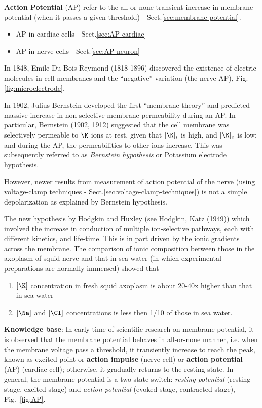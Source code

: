 {\bf Action Potential} (AP) refer to the all-or-none transient increase in
membrane potential (when it passes a given threshold) -
Sect.\ref{sec:membrane-potential}.
\begin{itemize}
  \item AP in cardiac cells - Sect.\ref{sec:AP-cardiac}
  \item AP in nerve cells - Sect.\ref{sec:AP-neuron}
\end{itemize} 

\begin{mdframed}
In 1848, Emile Du-Bois Reymond (1818-1896) discovered the existence of electric
molecules in cell membranes and the ``negative'' variation (the nerve AP),
Fig.\ref{fig:microelectrode}. 

In 1902, Julius Bernstein developed the first ``membrane theory'' and predicted
massive increase in non-selective membrane permeability during an AP. In
particular, Bernstein (1902, 1912) suggested that the cell membrane was
selectively permeable to $\K$ ions at rest, given that $[\K]_i$ is high, and
$[\K]_o$ is low; and during the AP, the permeabilities to other ions increase.
This was subsequently referred to as {\it Bernstein hypothesis} or Potassium
electrode hypothesis.

However, newer results from measurement of action potential of the nerve
(using voltage-clamp techniques - Sect.\ref{sec:voltage-clamp-techniques}) is
not a simple depolarization as explained by Bernstein hypothesis.

The new hypothesis by Hodgkin and Huxley (see Hodgkin, Katz (1949)) which
involved the increase in conduction of multiple ion-selective pathways, each
with different kinetics, and life-time. This is in part driven by the ionic
gradients across the membrane. The comparison of ionic composition between those
in the axoplasm of squid nerve and that in sea water (in which experimental
preparations are normally immersed) showed that

\begin{enumerate}

  \item $[\K]$ concentration in fresh squid axoplasm is about 20-40x higher than
  that in sea water

  \item $[\Na]$ and $[\Cl]$ concentrations is less then 1/10 of those in sea
  water.
\end{enumerate}

{\bf Knowledge base}: In early time of scientific research on membrane
potential, it is observed that the membrane potential behaves in all-or-none
manner, i.e. when the membrane voltage pass a threshold, it transiently increase
to reach the peak, known as excited point or {\bf action impulse} (nerve
cell) or {\bf action potential} (AP) (cardiac cell); otherwise, it gradually
returns to the resting state. In general, the membrane potential is a two-state
switch: {\it resting potential} (resting stage, excited stage) and {\it action
potential} (evoked stage, contracted stage), Fig.~\ref{fig:AP}.

\end{mdframed}


